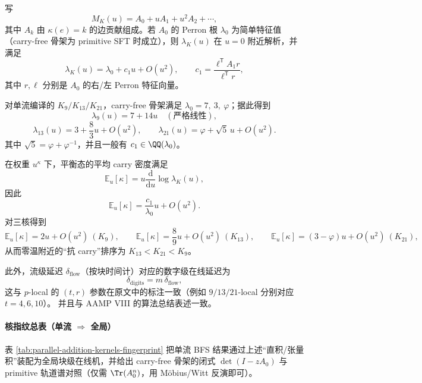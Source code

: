 \begin{proposition}[零温附近的线性响应不变量]\label{prop:lambda-linear-response}
写
\[
M_K(u)=A_0+uA_1+u^2A_2+\cdots,
\]
其中 $A_k$ 由 $\kappa(e)=k$ 的边贡献组成。若 $A_0$ 的 Perron 根 $\lambda_0$ 为简单特征值（carry-free 骨架为 primitive SFT 时成立），则 $\lambda_K(u)$ 在 $u=0$ 附近解析，并满足
\[
\lambda_K(u)=\lambda_0+c_1u+O(u^2),
\qquad
c_1=\frac{\ell^{\mathsf T}A_1 r}{\ell^{\mathsf T}r},
\]
其中 $r,\ell$ 分别是 $A_0$ 的右/左 Perron 特征向量。
\end{proposition}

\begin{corollary}[三核的精确一阶系数]\label{cor:lambda-linear-response-kernels}
对单流编译的 $K_9/K_{13}/K_{21}$，carry-free 骨架满足
\(
\lambda_0=7,\ 3,\ \varphi
\)；据此得到
\[
\lambda_{9}(u)=7+14u\quad(\text{严格线性}),
\]
\[
\lambda_{13}(u)=3+\frac{8}{3}u+O(u^2),
\qquad
\lambda_{21}(u)=\varphi+\sqrt5\,u+O(u^2).
\]
其中 $\sqrt5=\varphi+\varphi^{-1}$，并且一般有 $c_1\in\QQ(\lambda_0)$。
\end{corollary}

\begin{corollary}\label{cor:kappa-linear-response-order}
在权重 $u^{\kappa}$ 下，平衡态的平均 carry 密度满足
\[
\mathbb{E}_u[\kappa]=u\frac{\mathrm{d}}{\mathrm{d}u}\log\lambda_K(u),
\]
因此
\[
\mathbb{E}_u[\kappa]=\frac{c_1}{\lambda_0}u+O(u^2).
\]
对三核得到
\[
\mathbb{E}_u[\kappa]=2u+O(u^2)\ (K_9),\qquad
\mathbb{E}_u[\kappa]=\frac{8}{9}u+O(u^2)\ (K_{13}),\qquad
\mathbb{E}_u[\kappa]=(3-\varphi)u+O(u^2)\ (K_{21}),
\]
从而零温附近的“抗 carry”排序为 $K_{13}<K_{21}<K_{9}$。
\end{corollary}

此外，流级延迟 $\delta_{\mathrm{flow}}$（按块时间计）对应的数字级在线延迟为
\[
\delta_{\mathrm{digits}}=m\,\delta_{\mathrm{flow}},
\]
这与 $p$-local 的 $(t,r)$ 参数在原文中的标注一致（例如 $9/13/21$-local 分别对应 $t=4,6,10$）。\cite{FrougnyHellerPelantovaSvobodovaParallelAlgorithmsSlides,Frougny2012NumbersAsStreamsLeiden}
并且与 AAMP VIII 的算法总结表述一致。 \cite{SvobodovaAAMPVIIIParallelAddition}

\paragraph{核指纹总表（单流 $\Rightarrow$ 全局）}
表 \ref{tab:parallel-addition-kernels-fingerprint} 把单流 BFS 结果通过上述“直积/张量积”装配为全局块级在线机，并给出 carry-free 骨架的闭式 $\det(I-zA_0)$ 与 primitive 轨道谱对照（仅需 $\Tr(A_0^n)$，用 Möbius/Witt 反演即可）。


